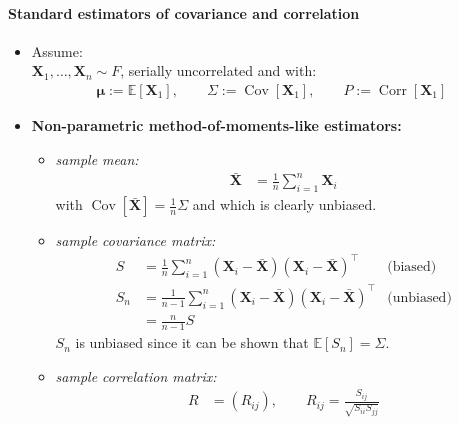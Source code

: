\documentclass[a4paper,landscape,8pt,fleqn]{scrartcl}
\renewcommand{\emph}[1]{\textbf{#1}}
\DeclareMathOperator{\Cov}{Cov}				%
\DeclareMathOperator{\Corr}{Corr}				%
\begin{document}
\begin{multicols*}{3}
\paragraph{Standard estimators of covariance and correlation}
\begin{itemize}
\item Assume: \\
$\bm X_1, \ldots, \bm X_n \sim F$, serially uncorrelated and with:
\begin{align*}
\bm \mu := \mathbb{E}[\bm X_1], \qquad \Sigma := \Cov[\bm X_1], \qquad P := \Corr[\bm X_1]
\end{align*}
\item \emph{Non-parametric method-of-moments-like estimators:}
\begin{itemize}
\item \textit{sample mean:}
\begin{align*}
\bar{\bm X} &= \frac{1}{n} \sum_{i=1}^n \bm X_i
\end{align*}
with $\Cov[\bar{\bm X}] = \frac{1}{n} \Sigma$ and which is clearly unbiased.
\item \textit{sample covariance matrix:}
\begin{align*}
S &= \frac{1}{n} \sum_{i=1}^n (\bm X_i - \bar{\bm X}) (\bm X_i - \bar{\bm X})^\top &\text{(biased)} \\
S_n &= \frac{1}{n-1} \sum_{i=1}^n (\bm X_i - \bar{\bm X}) (\bm X_i - \bar{\bm X})^\top &\text{(unbiased)} \\
&= \frac{n}{n-1} S
\end{align*}
$S_n$ is unbiased since it can be shown that $\mathbb{E}[S_n] = \Sigma$.
\item \textit{sample correlation matrix:}
\begin{align*}
R &= (R_{ij}), \qquad R_{ij} = \frac{S_{ij}}{\sqrt{S_{ii} S_{jj}}}
\end{align*}
\end{itemize}
\end{itemize}


\end{multicols*}
\end{document}
